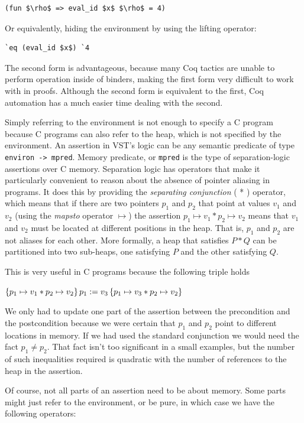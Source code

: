 \documentclass{puthesis}
\begin{document}
\begin{lstlisting}
(fun $\rho$ => eval_id $x$ $\rho$ = 4)
\end{lstlisting}

Or equivalently, hiding the environment by using the lifting operator:

\begin{lstlisting}
`eq (eval_id $x$) `4
\end{lstlisting}

The second form is advantageous, because many Coq tactics are unable to
perform operation inside of binders, making the first form very
difficult to work with in proofs. Although the second form is
equivalent to the first, Coq automation has a much easier time dealing
with the second.

Simply referring to the environment is not enough to specify a C
program because C programs can also refer to the heap, which is not
specified by the environment. An assertion in
VST's logic can be any semantic predicate of type 
\lstinline|environ -> mpred|.  Memory predicate, or \lstinline|mpred| 
is the type of separation-logic
assertions over C memory. Separation logic has operators that make it
particularly convenient to reason about the absence of pointer
aliasing in programs. It does this by providing the 
\emph{separating conjunction} ( * ) operator, which means that if there are two
pointers $p_1$ and $p_2$ that point at values $v_1$ and $v_2$ (using
the \emph{mapsto} operator $\mapsto$) the assertion $p_1 \mapsto v_1 *
p_2 \mapsto v_2$ means that $v_1$ and $v_2$ must be located at
different positions in the heap. That is, $p_1$ and $p_2$ are not
aliases for each other. More formally, a heap that satisfies $P * Q$
can be partitioned into two sub-heaps, one satisfying $P$ and the
other satisfying $Q$.

This is very useful in C programs because the following triple holds

$\{p_1 \mapsto v_1 * p_2 \mapsto v_2\}\,p_1 := v_3\,\{p_1 \mapsto v_3 * p_2 \mapsto v_2\}$

We only had to update one part of the assertion between the
precondition and the postcondition because we were
certain that $p_1$ and $p_2$ point to different locations in memory. If
we had used the standard conjunction we would need the fact
$p_1 \neq p_2$. That fact isn't too significant in a small examples, but the
number of such inequalities required is quadratic with
the number of references to the heap in the assertion. 

Of course, not all parts of an assertion need to be about memory. Some
parts might just refer to the environment, or be pure, in which case we
have the following operators:
\end{document}
